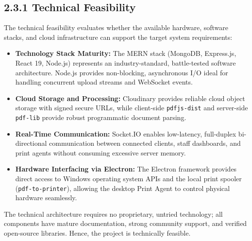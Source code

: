 \documentclass[12pt,a4paper,oneside]{report}
\begin{document}
\subsection{2.3.1 Technical Feasibility}
The technical feasibility evaluates whether the available hardware, software stacks, and cloud infrastructure can support the target system requirements:
\begin{itemize}[leftmargin=0.35in, itemsep=2pt]
  \item \textbf{Technology Stack Maturity:} The MERN stack (MongoDB, Express.js, React 19, Node.js) represents an industry-standard, battle-tested software architecture. Node.js provides non-blocking, asynchronous I/O ideal for handling concurrent upload streams and WebSocket events.
  \item \textbf{Cloud Storage and Processing:} Cloudinary provides reliable cloud object storage with signed secure URLs, while client-side \texttt{pdfjs-dist} and server-side \texttt{pdf-lib} provide robust programmatic document parsing.
  \item \textbf{Real-Time Communication:} Socket.IO enables low-latency, full-duplex bi-directional communication between connected clients, staff dashboards, and print agents without consuming excessive server memory.
  \item \textbf{Hardware Interfacing via Electron:} The Electron framework provides direct access to Windows operating system APIs and the local print spooler (\texttt{pdf-to-printer}), allowing the desktop Print Agent to control physical hardware seamlessly.
\end{itemize}
The technical architecture requires no proprietary, untried technology; all components have mature documentation, strong community support, and verified open-source libraries. Hence, the project is technically feasible.
\end{document}
